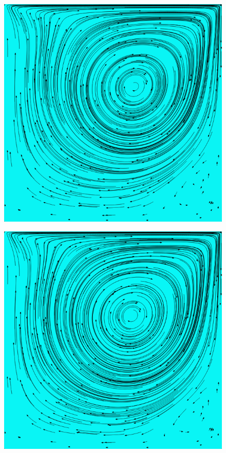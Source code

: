 		\begin{frame}
			\begin{figure}
				\centering
				\includegraphics[scale=0.4]{images/re-1000-512-10164.png}
			\end{figure}
		\end{frame}

		\begin{frame}
			\begin{figure}
				\centering
				\includegraphics[scale=0.4]{images/re-1000-512-11408.png}
			\end{figure}
		\end{frame}

